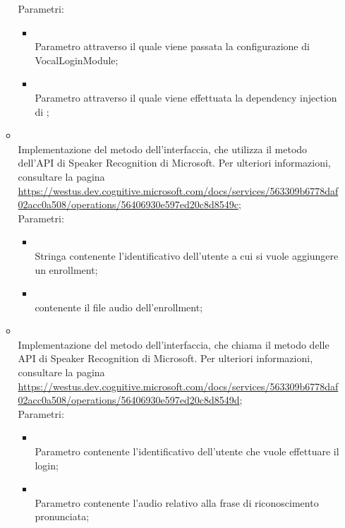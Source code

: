 \begin{itemize}
\begin{itemize}
		Parametri:
		\begin{itemize}
			\item {} \\
			Parametro attraverso il quale viene passata la configurazione di VocalLoginModule;
			\item {} \\
			Parametro attraverso il quale viene effettuata la dependency injection di ;
		\end{itemize}
		\item[]  \\
		Implementazione del metodo dell'interfaccia, che utilizza il metodo  dell'API di Speaker Recognition di Microsoft. Per ulteriori informazioni, consultare la pagina \url{https://westus.dev.cognitive.microsoft.com/docs/services/563309b6778daf02acc0a508/operations/56406930e597ed20c8d8549c};\\
		Parametri:
		\begin{itemize}
			\item {} \\
			Stringa contenente l'identificativo dell'utente a cui si vuole aggiungere un enrollment;
			\item {} \\
			 contenente il file audio dell'enrollment;
		\end{itemize}
		\item[]  \\
		Implementazione del metodo dell'interfaccia, che chiama il metodo  delle API di Speaker Recognition di Microsoft. Per ulteriori informazioni, consultare la pagina \url{https://westus.dev.cognitive.microsoft.com/docs/services/563309b6778daf02acc0a508/operations/56406930e597ed20c8d8549d};\\
		Parametri:
		\begin{itemize}
			\item {} \\
			Parametro contenente l'identificativo dell'utente che vuole effettuare il login;
			\item {} \\
			Parametro contenente l'audio relativo alla frase di riconoscimento pronunciata;
		\end{itemize}

\end{itemize}
\end{itemize}
